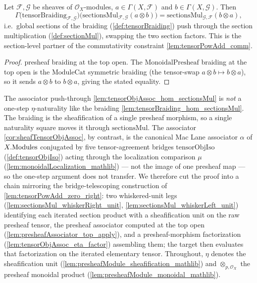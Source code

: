 \begin{lemma}

  \label{lem:tensorBraiding_hom_sectionsMul}
  Let \(\mathcal{F}, \mathcal{G}\) be sheaves of \(\mathcal{O}_X\)-modules,
  \(a \in \Gamma(X,\mathcal{F})\) and \(b \in \Gamma(X,\mathcal{G})\). Then
  \[
    \Gamma\bigl(\mathrm{tensorBraiding}_{\mathcal{F},\mathcal{G}}\bigr)
      \bigl(\mathrm{sectionsMul}_{\mathcal{F},\mathcal{G}}(a \otimes b)\bigr)
      = \mathrm{sectionsMul}_{\mathcal{G},\mathcal{F}}(b \otimes a),
  \]
  i.e.\ global sections of the braiding (\cref{def:tensorBraiding}) push through
  the section multiplication (\cref{def:sectionMul}), swapping the two section
  factors. This is the section-level partner of the commutativity constraint
  \cref{lem:tensorPowAdd_comm}.
\end{lemma}

\begin{proof}
  \leanok
  presheaf braiding at the top open. The
  \(\mathrm{MonoidalPresheaf}\) braiding at the top open is the
  \(\mathrm{ModuleCat}\) symmetric braiding (the tensor-swap
  \(a \otimes b \mapsto b \otimes a\)), so it sends \(a \otimes b\) to
  \(b \otimes a\), giving the stated equality.
\end{proof}

The associator push-through \cref{lem:tensorObjAssoc_hom_sectionsMul} is \emph{not}
a one-step \(\eta\)-naturality like the braiding
\cref{lem:tensorBraiding_hom_sectionsMul}. The braiding is the sheafification of a
single presheaf morphism, so a single naturality square moves it through
\(\mathrm{sectionsMul}\). The associator \cref{cor:sheafTensorObjAssoc}, by
contrast, is the canonical Mac Lane associator \(\alpha\) of \(X.\mathrm{Modules}\)
conjugated by five tensor-agreement bridges \(\mathrm{tensorObjIso}\)
(\cref{def:tensorObjIso}) acting through the localization comparison \(\mu\)
(\cref{lem:monoidalLocalization_mathlib}) --- not the image of one presheaf map ---
so the one-step argument does not transfer. We therefore cut the proof into a chain
mirroring the bridge-telescoping construction of
\cref{lem:tensorPowAdd_zero_right}: two whiskered-unit legs
(\cref{lem:sectionsMul_whiskerRight_unit},
\cref{lem:sectionsMul_whiskerLeft_unit}) identifying each iterated section product
with a sheafification unit on the raw presheaf tensor, the presheaf associator
computed at the top open (\cref{lem:presheafAssociator_top_apply}), and a
presheaf-morphism factorization (\cref{lem:tensorObjAssoc_eta_factor}) assembling
them; the target then evaluates that factorization on the iterated elementary
tensor. Throughout, \(\eta\) denotes the sheafification unit
(\cref{lem:presheafModule_sheafification_mathlib}) and \(\otimes_{p,\mathcal{O}_X}\)
the presheaf monoidal product (\cref{lem:presheafModule_monoidal_mathlib}).

